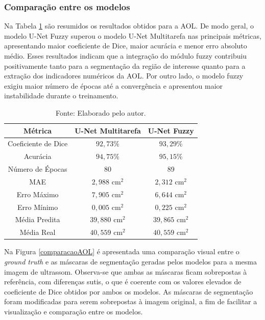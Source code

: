 \subsubsection{Comparação entre os modelos}
Na Tabela \ref{cap3:tabelaAOL} são resumidos os resultados obtidos para a AOL. De modo geral, o modelo U-Net Fuzzy superou o modelo U-Net Multitarefa nas principais métricas, apresentando maior coeficiente de Dice, maior acurácia e menor erro absoluto médio. Esses resultados indicam que a integração do módulo fuzzy contribuiu positivamente tanto para a segmentação da região de interesse quanto para a extração dos indicadores numéricos da AOL. Por outro lado, o modelo fuzzy exigiu maior número de épocas até a convergência e apresentou maior instabilidade durante o treinamento. 
\begin{table}[htpb]
    \centering
    \caption{Resumo dos resultados obtidos para a AOL, comparando o modelo de U-Net Multitarefa com o modelo de U-Net Fuzzy.}
    \begin{tabular}{ccc}
        \hline
        \textbf{Métrica} & \textbf{U-Net Multitarefa} & \textbf{U-Net Fuzzy} \\
        \hline
        Coeficiente de Dice & $92,73\%$ & $93,29\%$ \\
        \hline
        Acurácia & $94,75\%$ & $95,15\%$ \\
        \hline
        Número de Épocas & 80 & 89 \\
        \hline
        MAE & $2,988$ cm$^2$ & $2,312$ cm$^2$ \\
        \hline
        Erro Máximo & $7,905$ cm$^2$ & $6,644$ cm$^2$ \\
        \hline
        Erro Mínimo & $0,005$ cm$^2$ & $0,225$ cm$^2$ \\
        \hline
        Média Predita & $39,880$ cm$^2$ & $39,865$ cm$^2$ \\
        \hline
        Média Real & $40,559$ cm$^2$ & $40,559$ cm$^2$ \\
        \hline
    \end{tabular}
    \caption*{Fonte: Elaborado pelo autor.}
    \label{cap3:tabelaAOL}
\end{table}

Na Figura \ref{comparacaoAOL} é apresentada uma comparação visual entre o \textit{ground truth} e as máscaras de segmentação geradas pelos modelos para a mesma imagem de ultrassom. Observa-se que ambas as máscaras ficam sobrepostas à referência, com diferenças sutis, o que é coerente com os valores elevados de coeficiente de Dice obtidos por ambos os modelos. As máscaras de segmentação foram modificadas para serem sobrepostas à imagem original, a fim de facilitar a visualização e comparação entre os modelos. 

